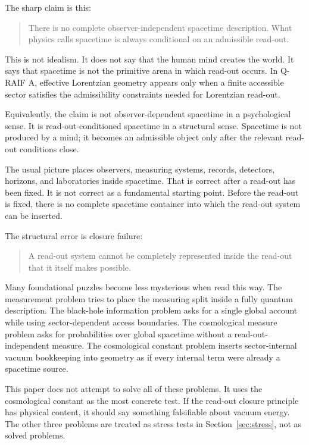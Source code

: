 \documentclass[12pt,a4paper]{article}
\theoremstyle{definition}
\theoremstyle{remark}
\begin{document}
The sharp claim is this:

\begin{quote}
There is no complete observer-independent spacetime description. What physics calls spacetime is always conditional on an admissible read-out.
\end{quote}

This is not idealism. It does not say that the human mind creates the world. It says that spacetime is not the primitive arena in which read-out occurs. In Q-RAIF A, effective Lorentzian geometry appears only when a finite accessible sector satisfies the admissibility constraints needed for Lorentzian read-out.

Equivalently, the claim is not observer-dependent spacetime in a psychological sense. It is read-out-conditioned spacetime in a structural sense. Spacetime is not produced by a mind; it becomes an admissible object only after the relevant read-out conditions close.

The usual picture places observers, measuring systems, records, detectors, horizons, and laboratories inside spacetime. That is correct after a read-out has been fixed. It is not correct as a fundamental starting point. Before the read-out is fixed, there is no complete spacetime container into which the read-out system can be inserted.

The structural error is closure failure:

\begin{quote}
A read-out system cannot be completely represented inside the read-out that it itself makes possible.
\end{quote}

Many foundational puzzles become less mysterious when read this way. The measurement problem tries to place the measuring split inside a fully quantum description. The black-hole information problem asks for a single global account while using sector-dependent access boundaries. The cosmological measure problem asks for probabilities over global spacetime without a read-out-independent measure. The cosmological constant problem inserts sector-internal vacuum bookkeeping into geometry as if every internal term were already a spacetime source.

This paper does not attempt to solve all of these problems. It uses the cosmological constant as the most concrete test. If the read-out closure principle has physical content, it should say something falsifiable about vacuum energy. The other three problems are treated as stress tests in Section~\ref{sec:stress}, not as solved problems.
\end{document}
